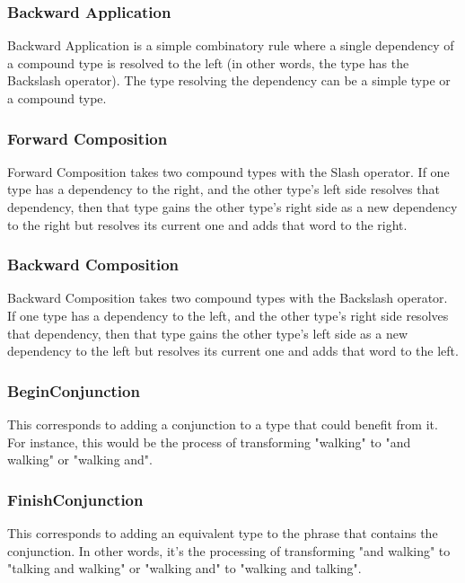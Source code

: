 \subsubsection{Backward Application}
Backward Application is a simple combinatory rule where a single dependency of a compound type is resolved to the left (in other words, the type has the Backslash operator). The type resolving the dependency can be a simple type or a compound type.
\subsubsection{Forward Composition}
Forward Composition takes two compound types with the Slash operator. If one type has a dependency to the right, and the other type's left side resolves that dependency, then that type gains the other type's right side as a new dependency to the right but resolves its current one and adds that word to the right. 
\subsubsection{Backward Composition}
Backward Composition takes two compound types with the Backslash operator. If one type has a dependency to the left, and the other type's right side resolves that dependency, then that type gains the other type's left side as a new dependency to the left but resolves its current one and adds that word to the left.  
\subsubsection{BeginConjunction}
This corresponds to adding a conjunction to a type that could benefit from it. For instance, this would be the process of transforming "walking" to "and walking" or "walking and". 
\subsubsection{FinishConjunction}
This corresponds to adding an equivalent type to the phrase that contains the conjunction. In other words, it's the processing of transforming "and walking" to "talking and walking" or "walking and" to "walking and talking".
